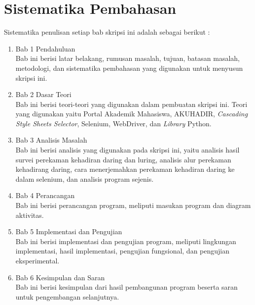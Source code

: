 \section{Sistematika Pembahasan}
\label{sec:sispem}
Sistematika penulisan setiap bab skripsi ini adalah sebagai berikut :
\begin{enumerate}
	\item Bab 1 Pendahuluan \\
	Bab ini berisi latar belakang, rumusan masalah, tujuan, batasan masalah, metodologi, dan sistematika pembahasan yang digunakan untuk menyusun skripsi ini.
	\item Bab 2 Dasar Teori \\
	Bab ini berisi teori-teori yang digunakan dalam pembuatan skripsi ini. Teori yang digunakan yaitu Portal Akademik Mahasiswa, AKUHADIR, \textit{Cascading Style Sheets Selector}, Selenium, WebDriver, dan \textit{Library} Python.
	\item Bab 3 Analisis Masalah \\
	Bab ini berisi analisis yang digunakan pada skripsi ini, yaitu analisis hasil survei perekaman kehadiran daring dan luring, analisis alur perekaman kehadirang daring, cara menerjemahkan perekaman kehadiran daring ke dalam selenium, dan analisis program sejenis.
	\item Bab 4 Perancangan \\
	Bab ini berisi perancangan program, meliputi masukan program dan diagram aktivitas.
	\item Bab 5 Implementasi dan Pengujian\\
	Bab ini berisi implementasi dan pengujian program, meliputi lingkungan implementasi, hasil implementasi, pengujian fungsional, dan pengujian eksperimental.
	\item Bab 6 Kesimpulan dan Saran \\
	Bab ini berisi kesimpulan dari hasil pembangunan program beserta saran untuk pengembangan selanjutnya.
\end{enumerate}

